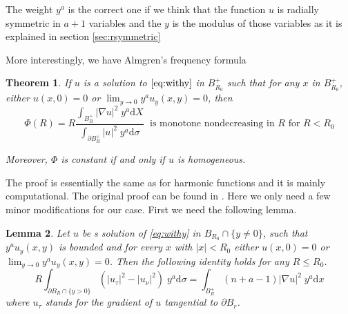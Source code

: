 \documentclass[letterpaper]{article}
\newtheorem{thm}{Theorem}[section]
\newtheorem{lemma}[thm]{Lemma}
\numberwithin{equation}{section}
\newcommand{\abs}[1]{\left\vert#1\right\vert}
\newcommand{\grad} {\nabla}
\newcommand{\bdary} {\partial}
\newcommand{\party}[1] {#1_y}
\newcommand{\ydd} {\; y^a \mathrm{d}}
\begin{document}
The weight $y^a$ is the correct one if we think that the function $u$ is radially symmetric in $a+1$ variables and the $y$ is the modulus of those variables as it is explained in section \ref{sec:rsymmetric}

More interestingly, we have Almgren's frequency formula
\begin{thm} \label{thm:Almgren}
If $u$ is a solution to $\eqref{eq:withy}$ in $B_{R_0}^+$ such that for any $x$ in $B_{R_0}^+$, either $u(x,0)=0$ or $\lim_{y \to 0} y^a \party u(x,y) = 0$, then
\[ \Phi(R) = R  \frac{\int_{B_R^+} \abs{\grad u}^2 \ydd X}{\int_{\bdary B_R^+}  \abs{u}^2 \ydd \sigma} \; \text{  is monotone nondecreasing in $R$ for $R< R_0$}\]

Moreover, $\Phi$ is constant if and only if $u$ is homogeneous.
\end{thm}

The proof is essentially the same as for harmonic functions and it is mainly computational. The original proof can be found in \cite{A}. Here we only need a few minor modifications for our case. First we need the following lemma.

\begin{lemma} \label{lem:Almgren}
Let $u$ be s solution of \eqref{eq:withy} in $B_{R_0} \cap \{y \neq 0\}$, such that $y^a \party u(x,y)$ is bounded and for every $x$ with $\abs{x}<R_0$ either $u(x,0)=0$ or $\lim_{y \to 0} y^a \party u(x,y) = 0$. Then the following identity holds for any $R \leq R_0$.
\begin{equation} \label{eq:diva}
R \int_{\bdary B_R \cap \{y>0\} }  \left( \abs{u_\tau}^2 - \abs{ u_\nu }^2 \right) \ydd \sigma = \int_{B_R^+}  (n+a-1) \abs{\grad u}^2 \ydd x
\end{equation}
where $u_\tau$ stands for the gradient of $u$ tangential to $\bdary B_r$.
\end{lemma}
\end{document}
